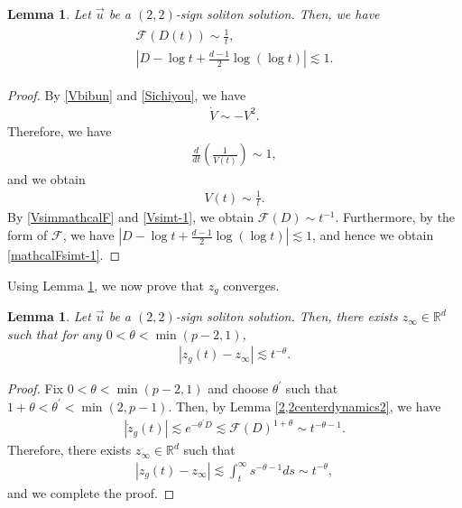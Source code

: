\documentclass[reqno]{amsart}
\theoremstyle{plain}
\newtheorem{lemma}[theorem]{Lemma}
\theoremstyle{definition}
\numberwithin{equation}{section}
\begin{document}
\begin{lemma}\label{Fsimt-1lem}
Let $\vec{u}$ be a $(2,2)$-sign soliton solution. Then, we have
\begin{align}\label{mathcalFsimt-1}
\begin{aligned}
\mathcal{F}(D(t))\sim \frac{1}{t},
\\
\left|D-\log{t}+\frac{d-1}{2}\log{(\log{t})}\right|\lesssim 1.
\end{aligned}
\end{align}
\end{lemma}
\begin{proof}
By \eqref{Vbibun} and \eqref{Sichiyou}, we have
\begin{align*}
\dot{V}\sim -V^2.
\end{align*}
Therefore, we have
\begin{align*}
\frac{d}{dt}\left(\frac{1}{V(t)}\right)\sim 1,
\end{align*}
and we obtain 
\begin{align}\label{Vsimt-1}
V(t)\sim \frac{1}{t}.
\end{align}
By \eqref{VsimmathcalF} and \eqref{Vsimt-1}, we obtain $\mathcal{F}(D)\sim t^{-1}$. Furthermore, by the form of $\mathcal{F}$, we have $|D-\log{t}+\frac{d-1}{2}\log{(\log{t})}|\lesssim 1$, and hence we obtain \eqref{mathcalFsimt-1}.
\end{proof}
Using Lemma \ref{Fsimt-1lem}, we now prove that $z_g$ converges.
\begin{lemma}\label{zgshusoku}
Let $\vec{u}$ be a $(2,2)$-sign soliton solution. Then, there exists $z_{\infty}\in \mathbb{R}^d$ such that for any $0<\theta<\min{(p-2,1)}$,
\begin{align}\label{jushines}
|z_g(t)-z_{\infty}|\lesssim t^{-\theta}.
\end{align}
\end{lemma}
\begin{proof}
Fix $0<\theta<\min{(p-2,1)}$ and choose $\theta^{\prime}$ such that $1+\theta<\theta^{\prime}<\min{(2,p-1)}$. Then, by Lemma \ref{2,2centerdynamics2}, we have
\begin{align*}
|\dot{z}_g(t)|\lesssim e^{-\theta^{\prime}D}\lesssim \mathcal{F}(D)^{1+\theta}\sim t^{-\theta-1}.
\end{align*}
Therefore, there exists $z_{\infty}\in \mathbb{R}^d$ such that 
\begin{align*}
|z_g(t)-z_{\infty}|\lesssim \int_t^{\infty} s^{-\theta-1}ds\sim t^{-\theta},
\end{align*}
and we complete the proof.
\end{proof}
\end{document}
